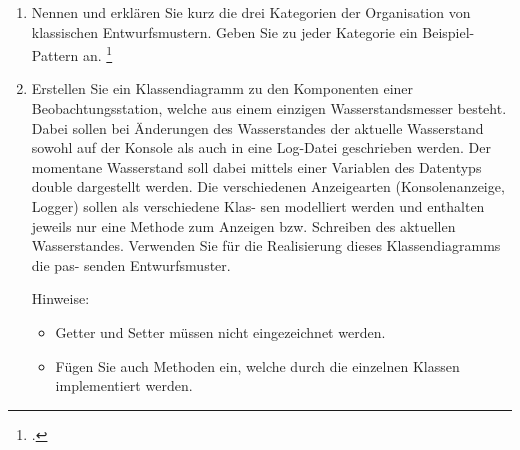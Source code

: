\documentclass{bschlangaul-aufgabe}
\begin{document}

\begin{enumerate}


\item Nennen und erklären Sie kurz die drei Kategorien der Organisation
von klassischen Entwurfsmustern. Geben Sie zu jeder Kategorie ein
Beispiel-Pattern an.
\footcite{examen:66116:2021:03}


\item Erstellen Sie ein Klassendiagramm zu den Komponenten einer
Beobachtungsstation, welche aus einem einzigen Wasserstandsmesser
besteht. Dabei sollen bei Änderungen des Wasserstandes der aktuelle
Wasserstand sowohl auf der Konsole als auch in eine Log-Datei
geschrieben werden. Der momentane Wasserstand soll dabei mittels einer
Variablen des Datentyps double dargestellt werden. Die verschiedenen
Anzeigearten (Konsolenanzeige, Logger) sollen als verschiedene Klas- sen
modelliert werden und enthalten jeweils nur eine Methode zum Anzeigen
bzw. Schreiben des aktuellen Wasserstandes. Verwenden Sie für die
Realisierung dieses Klassendiagramms die pas- senden Entwurfsmuster.

Hinweise:

\begin{itemize}
\item Getter und Setter müssen nicht eingezeichnet werden.

\item Fügen Sie auch Methoden ein, welche durch die einzelnen Klassen
implementiert werden.

\end{itemize}
\end{enumerate}
\end{document}
